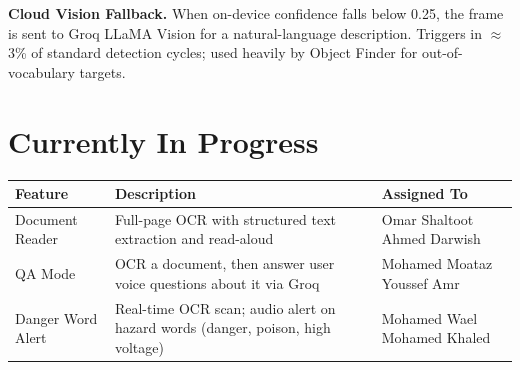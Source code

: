 \documentclass[12pt, a4paper]{article}
\begin{document}
\textbf{Cloud Vision Fallback.}
When on-device confidence falls below 0.25, the frame is sent to Groq LLaMA Vision
for a natural-language description. Triggers in $\approx$3\% of standard detection
cycles; used heavily by Object Finder for out-of-vocabulary targets.

\section{Currently In Progress}

\begin{tabular}{p{4.5cm} p{5.5cm} p{4cm}}
\toprule
\textbf{Feature} & \textbf{Description} & \textbf{Assigned To} \\
\midrule
Document Reader
  & Full-page OCR with structured text extraction and read-aloud
  & Omar Shaltoot \newline Ahmed Darwish \\[8pt]
QA Mode
  & OCR a document, then answer user voice questions about it via Groq
  & Mohamed Moataz \newline Youssef Amr \\[8pt]
Danger Word Alert
  & Real-time OCR scan; audio alert on hazard words (danger, poison, high voltage)
  & Mohamed Wael \newline Mohamed Khaled \\
\bottomrule
\end{tabular}
\end{document}
